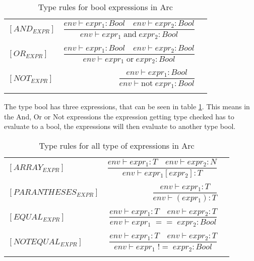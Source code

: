 \begin{table}[htb!]
    \centering
    \begin{tabular}{lr>{\raggedright\arraybackslash}p{6cm}}
    $[AND_{EXPR}] $        & $\dfrac
        {env\vdash expr_1: Bool \quad env\vdash expr_2: Bool}
        {env\vdash expr_1 \;\text{and} \;expr_2: Bool}$
    \\
    \\
    $[OR_{EXPR}] $         & $\dfrac
        {env\vdash expr_1: Bool \quad env\vdash expr_2: Bool}
        {env\vdash expr_1 \;\text{or} \;expr_2: Bool}$
    \\
    \\
    $[NOT_{EXPR}] $        & $\dfrac
        {env\vdash expr_1: Bool}
        {env\vdash \text{not} \; expr_1 : Bool}$
    \\
    \\
    \end{tabular}
    \caption{Type rules for bool expressions in Arc}
    \label{tab:bool-rules}
\end{table}

The type bool has three expressions, that can be seen in table \ref*{tab:bool-rules}. This means in the And, Or or Not expressions the expression getting type checked has to evaluate to a bool, the expressions will then evaluate to another type bool. 

\begin{table}[htb!]
    \centering
    \begin{tabular}{lr>{\raggedright\arraybackslash}p{6cm}}
        $[ARRAY_{EXPR}]$       & $ \dfrac
            {env\vdash expr_1: T \quad env \vdash expr_2 : N}
            {env\vdash expr_1[expr_2] : T}$
        \\
        \\
        $[PARANTHESES_{EXPR}]$ & $ \dfrac
            {env\vdash expr_1: T}
            {env\vdash (expr_1) : T}$
        \\
        \\
        $[EQUAL_{EXPR}] $      & $\dfrac
            {env\vdash expr_1: T \quad env\vdash expr_2: T}
            {env\vdash expr_1 \;== \;expr_2: Bool}$
        \\
        \\
        $[NOTEQUAL_{EXPR}] $   & $\dfrac
        {env\vdash expr_1: T \quad env\vdash expr_2: T}
        {env\vdash expr_1 \;!= \;expr_2: Bool}$
    \\
    \\
    \end{tabular}
    \caption{Type rules for all type of expressions in Arc}
    \label{tab:expr-rules}
\end{table}

